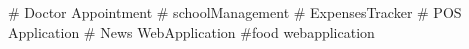 # Doctor Appointment
# schoolManagement
# ExpensesTracker
# POS Application 
# News WebApplication 
#food webapplication



